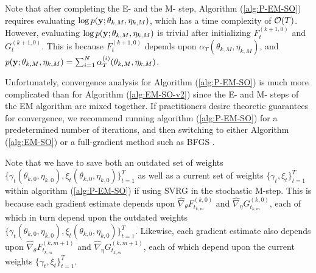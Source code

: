 Note that after completing the E- and the M- step, Algorithm (\ref{alg:P-EM-SO}) requires evaluating $\log p(\mathbf{y};\theta_{k,M},\eta_{k,M})$, which has a time complexity of $\mathcal{O}(T)$. However, evaluating $\log p(\mathbf{y};\theta_{k,M},\eta_{k,M})$ is trivial after initializing $F_t^{(k+1,0)}$ and $G_t^{(k+1,0)}$. This is because $F_t^{(k+1,0)}$ depends upon $\alpha_T(\theta_{k,M},\eta_{k,M})$, and $p(\mathbf{y};\theta_{k,M},\eta_{k,M}) = \sum_{i=1}^N \alpha_T^{(i)}(\theta_{k,M},\eta_{k,M})$.

Unfortunately, convergence analysis for Algorithm (\ref{alg:P-EM-SO}) is much more complicated than for Algorithm (\ref{alg:EM-SO-v2}) since the E- and M- steps of the EM algorithm are mixed together. If practitioners desire theoretic guarantees for convergence, we recommend running algorithm (\ref{alg:P-EM-SO}) for a predetermined number of iterations, and then switching to either Algorithm (\ref{alg:EM-SO}) or a full-gradient method such as BFGS \citep{Fletcher:2000}.




Note that we have to save both an outdated set of weights $\big\{\gamma_t(\theta_{k,0},\eta_{k,0}),\xi_t(\theta_{k,0},\eta_{k,0})\big\}_{t=1}^T$ as well as a current set of weights $\big\{ \gamma_t,\xi_t \big\}_{t=1}^T$ within algorithm (\ref{alg:P-EM-SO}) if using SVRG in the stochastic M-step. This is because each gradient estimate depends upon $\widehat \nabla_\theta F_{t_{k,m}}^{(k,0)}$ and $\widehat \nabla_\eta G_{t_{k,m}}^{(k,0)}$, each of which in turn depend upon the outdated weights $\{\gamma_t(\theta_{k,0},\eta_{k,0}),\xi_t(\theta_{k,0},\eta_{k,0})\}_{t=1}^T$. Likewise, each gradient estimate also depends upon $\widehat \nabla_\theta F_{t_{k,m}}^{(k,m+1)}$ and $\widehat \nabla_\eta G_{t_{k,m}}^{(k,m+1)}$, each of which depend upon the current weights $\big\{ \gamma_t,\xi_t \big\}_{t=1}^T$.

